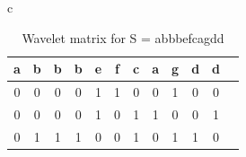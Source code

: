 \begin{table}[t]
	\begin{center}
		\begin{tabular}{c}
            \begin{tabular}{c c c c c c c c c c c c}
                a & b & b & b & e & f & c & a & g & d & d \\
                \hline
                0 & 0 & 0 & 0 & 1 & 1 & 0 & 0 & 1 & 0 & 0 \\
                0 & 0 & 0 & 0 & 1 & 0 & 1 & 1 & 0 & 0 & 1 \\
                0 & 1 & 1 & 1 & 0 & 0 & 1 & 0 & 1 & 1 & 0
            \end{tabular} \\
		\end{tabular}
		\caption{Wavelet matrix for S = abbbefcagdd}
		\label{table:waveletmatrix}
	\end{center}
\end{table}


